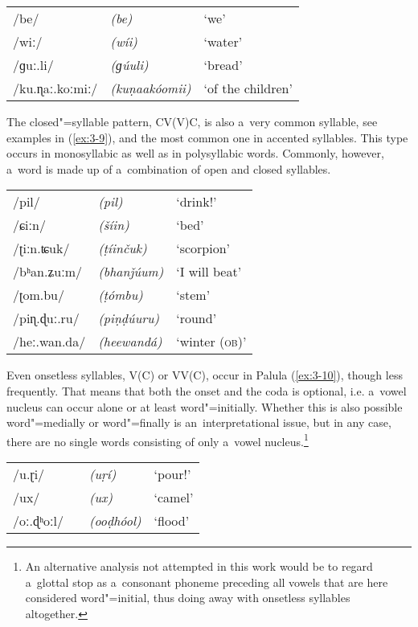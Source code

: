 \begin{exe}
\extab
\label{ex:3-8}
\begin{tabular}{ l l l }
/be/ &
\textit{(be)} &
`we'\\
/wiː/ &
\textit{(wíi)} &
`water'\\
/ɡuː.li/ &
\textit{(ɡúuli)} &
`bread'\\
/ku.ɳaː.koːmiː/ &
\textit{(kuṇaakóomii)} &
`of the children'\\
\end{tabular}
\end{exe}



The closed"=syllable pattern, CV(V)C, is also a~very common syllable, see examples in (\ref{ex:3-9}), and the most common one in accented syllables. This type occurs in monosyllabic as well as in polysyllabic words. Commonly, however, a~word is made up of a~combination of open and closed syllables. 


\begin{exe}
\extab
\label{ex:3-9}
\begin{tabular}{ l l l }
/pil/ &
\textit{(pil)} &
`drink!' \\
/ɕiːn/ &
\textit{(\v{s}íin)} &
`bed'\\
/ʈiːn.ʨuk/ &
\textit{(ṭíinčuk)} &
`scorpion'\\
/bʰan.ʑuːm/ &
\textit{(bhanǰúum)} &
`I will beat'\\
/ʈom.bu/ &
\textit{(ṭómbu)} &
`stem'\\
/piɳ.ɖuː.ru/ &
\textit{(piṇḍúuru)} &
`round'\\
/heː.wan.da/ &
\textit{(heewandá)} &
`winter (\textsc{ob)}'\\
\end{tabular}
\end{exe}


Even onsetless syllables, V(C) or VV(C), occur in Palula (\ref{ex:3-10}), though less frequently. That means that both the onset and the coda is optional, i.e. a~vowel nucleus can occur alone or at least word"=initially. Whether this is also possible word"=medially or word"=finally is an~interpretational issue, but in any case, there are no single words consisting of only a~vowel nucleus.\footnote{An alternative analysis not attempted in this work would be to regard a~glottal stop as a~consonant phoneme preceding all vowels that are here considered word"=initial, thus doing away with onsetless syllables altogether.}


\begin{exe}
\extab
\label{ex:3-10}
\begin{tabular}{ l l l }
/u.ɽi/ &
\textit{(uṛí)} &
`pour!' \\
/ux/ &
\textit{(ux)} &
`camel'\\
/oː.ɖʰoːl/\ \ &
\textit{(ooḍhóol)} &
`flood'\\
\end{tabular}
\end{exe}


